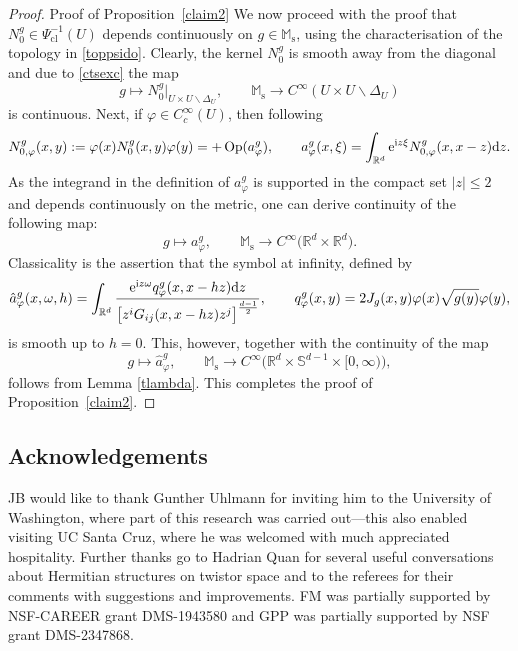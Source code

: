 \documentclass[pdftex]{sigma}
\numberwithin{equation}{section}
\theoremstyle{definition}
\newcommand{\R}{\mathbb{R}} %
\newcommand{\M}{\mathbb{M}}
\newcommand{\Ms}{\M_{\mathrm{s}}}
\newcommand{\1}{{\bf 1}}
\DeclareMathOperator{\Op}{Op}
\newcommand{\cl}{\mathrm{cl}}
\begin{document}
\begin{proof}{Proof of Proposition~\ref{claim2}}
We now proceed with the proof that $N^g_0 \in \Psi^{-1}_\cl(U)$ depends continuously on $g\in \Ms$, using the characterisation of the topology in \eqref{toppsido}.
Clearly, the kernel $N^g_0$ is smooth away from the diagonal and due to \eqref{ctsexc} the map
\[
	g\mapsto N^g_0\vert_{U\times U\backslash \Delta_U},\qquad \Ms\rightarrow C^\infty(U\times U\backslash \Delta_U)
\]
is continuous. Next, if $\varphi\in C_c^\infty(U)$, then following \cite[Chapter 8.1]{PSU23}
\[
	N^g_{0,\varphi}(x,y):=\varphi(x)N^g_0(x,y)\varphi(y) = +
	\Op(a^g_\varphi),\qquad a_\varphi^g(x,\xi)=\int_{\R^d} {\rm e}^{{\rm i}z\xi} N^g_{0,\varphi}(x,x-z) {\rm d}z.
\]
As the integrand in the definition of $a^g_\varphi$ is supported in the compact set $|z|\le 2$ and depends continuously on the metric, one can derive continuity of the following map:
\[
	g\mapsto a^g_\varphi,\qquad \Ms\rightarrow C^\infty\bigl(\R^d\times \R^d\bigr).
\]
Classicality is the assertion that the symbol at infinity, defined by
\[
\hat a_\varphi^g(x,\omega,h)=\int_{\R^d} \frac{{\rm e}^{{\rm i}z\omega} q_\varphi^g(x,x-hz) {\rm d}z}{\big[z^iG_{ij}(x,x-hz)z^j\big]^{\frac{d-1}2}}, \qquad q_\varphi^g(x,y) = 2 J_g(x,y)\varphi(x) \sqrt{g(y)} \varphi(y),
\]
is smooth up to $h=0$. This, however, together with the continuity of the map
\[
	g\mapsto \hat a_\varphi^g,\qquad \mathbb M_\mathrm{s} \to C^\infty\bigl(\R^d\times \mathbb S^{d-1} \times [0,\infty)\bigr),
\]
follows from Lemma \ref{tlambda}. This completes the proof of Proposition~\ref{claim2}.
\end{proof}

\subsection*{Acknowledgements}

JB would like to thank {Gunther Uhlmann} for inviting him to the University of Washington, where part of this research was carried out---this also enabled visiting UC Santa Cruz, where he was welcomed with much appreciated hospitality. Further thanks go to {Hadrian Quan} for several useful conversations about Hermitian structures on twistor space and to the referees for their comments with suggestions and improvements. FM was partially supported by NSF-CAREER grant DMS-1943580 and GPP was partially supported by NSF grant DMS-2347868.
\end{document}
